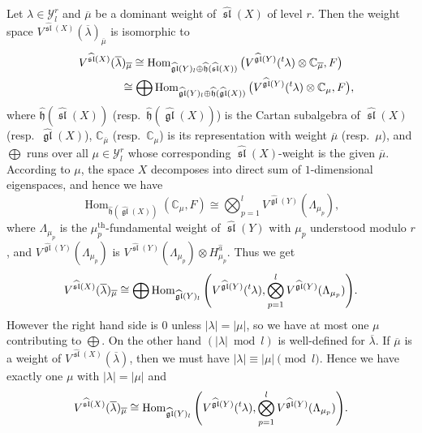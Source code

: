 \documentclass[pdftex]{sigma}
\theoremstyle{definition}
\numberwithin{equation}{section}
\newcommand{\lsp}[2]{{\mskip-.3mu}{}^{#1}\mskip-1mu{#2}}
\newcommand{\C}{{\mathbb C}}
\newcommand{\algsl}{\operatorname{\mathfrak{sl}}} %
\newcommand{\gl}{\operatorname{\mathfrak{gl}}}
\newcommand{\Hom}{\operatorname{Hom}}
\begin{document}
Let $\lambda\in\mathscr{Y}^r_l$ and $\overline{\mu}$ be a dominant
weight of $\widehat{\algsl}(X)$ of level $r$. Then the weight space
$V^{\widehat{\algsl}(X)}(\overline{\lambda})_{\overline\mu}$ is
isomorphic to
\begin{gather*}
  V^{\widehat{\algsl}(X)}(\overline\lambda)_{\overline\mu}
    \cong
  \Hom_{\widehat{\gl}(Y)_l\oplus \widehat{\mathfrak h}({\widehat{\algsl}(X)})}\big(
  V^{\widehat{\gl}(Y)}(\lsp{t}\lambda)\otimes\C_{\overline\mu}, F\big)
\\
\phantom{V^{\widehat{\algsl}(X)}(\overline\lambda)_{\overline\mu}}{}  \cong
  \bigoplus
  \Hom_{\widehat{\gl}(Y)_l\oplus \widehat{\mathfrak h}(\widehat{\gl}(X))}\big(
  V^{\widehat{\gl}(Y)}(\lsp{t}\lambda)\otimes\C_\mu, F\big),
\end{gather*}
where $\widehat{\mathfrak h}(\widehat{\algsl}(X))$ (resp.\
$\widehat{\mathfrak h}(\widehat{\gl}(X))$) is the Cartan subalgebra of
$\widehat{\algsl}(X)$ (resp.\ $\widehat{\gl}(X)$), $\C_{\overline\mu}$
(resp.\ $\C_\mu$) is its representation with weight $\overline{\mu}$
(resp.\ $\mu$), and $\bigoplus$ runs over all $\mu\in\mathscr Y^r_l$
whose corresponding $\widehat{\algsl}(X)$-weight is the given
$\overline\mu$.
%
According to $\mu$, the space $X$ decomposes into direct sum of
$1$-dimensional eigenspaces, and hence we have
\begin{equation}\label{eq:fund}
  \Hom_{\widehat{\mathfrak h}(\widehat{\gl}(X))}(\C_\mu, F)
  \cong
  \bigotimes_{p=1}^l V^{\widehat{\gl}(Y)}(\Lambda_{\mu_p}),
\end{equation}
where $\Lambda_{\mu_p}$ is the $\mu_p^{\mathrm{th}}$-fundamental
weight of $\widehat{\algsl}(Y)$ with $\mu_p$ understood modulo $r$,
and $V^{\widehat{\gl}(Y)}(\Lambda_{\mu_p})$ is
$V^{\widehat{\algsl}(Y)}(\Lambda_{\mu_p})\otimes
H^{\widehat{a}}_{\mu_p}$. Thus we get
\begin{equation*}
  V^{\widehat{\algsl}(X)}(\overline\lambda)_{\overline\mu}
  \cong \bigoplus
  \Hom_{\widehat{\gl}(Y)_l}\Bigg(V^{\widehat{\gl}(Y)}(\lsp{t}\lambda),
  \bigotimes_{p=1}^l V^{\widehat{\gl}(Y)}(\Lambda_{\mu_p})\Bigg).
\end{equation*}
However the right hand side is $0$ unless $|\lambda|=|\mu|$, so
we have at most one $\mu$ contributing to $\bigoplus$.
%
On the other hand $(|\lambda|\bmod l)$ is well-def\/ined for
$\overline\lambda$. If $\overline\mu$ is a weight of
$V^{\widehat{\algsl}(X)}(\overline\lambda)$, then we must have
$|\lambda| \equiv |\mu|\pmod l$.
Hence we have exactly one $\mu$ with $|\lambda|=|\mu|$ and
\begin{equation}\label{eq:duality}
  V^{\widehat{\algsl}(X)}(\overline\lambda)_{\overline\mu}
  \cong
  \Hom_{\widehat{\gl}(Y)_l}\Bigg(V^{\widehat{\gl}(Y)}(\lsp{t}\lambda),
  \bigotimes_{p=1}^l V^{\widehat{\gl}(Y)}(\Lambda_{\mu_p})\Bigg).
\end{equation}
\end{document}

